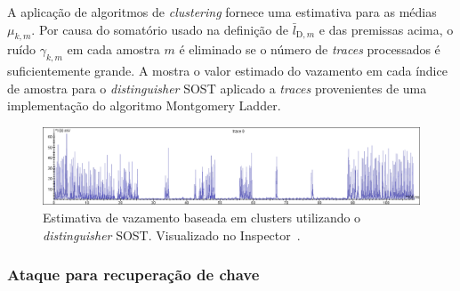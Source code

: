 \documentclass{SBCbookchapter}
\begin{document}
A aplicação de algoritmos de \emph{clustering} fornece uma estimativa para as médias $\mu_{k,m}$. Por causa do somatório usado na definição de $\bar{l}_{\text{D}, m}$ e das premissas acima, o ruído $\gamma_{k,m}$ em cada amostra $m$ é eliminado se o número de \emph{traces} processados é suficientemente grande. A  mostra o valor estimado do vazamento em cada índice de amostra para o \emph{distinguisher} SOST aplicado a \emph{traces} provenientes de uma implementação do algoritmo Montgomery Ladder.

\begin{figure}
	\centering
	\includegraphics[width=1\linewidth]{figures/Trace__Cluster_Leakage_Assessment_by_SOST_method.png}
	\caption{Estimativa de vazamento baseada em clusters utilizando o \emph{distinguisher} SOST. Visualizado no Inspector~\cite{RiscureInspector}.}
	\label{fig:traceCLA_SOST}
\end{figure}

\subsubsection{Ataque para recuperação de chave}
\end{document}
